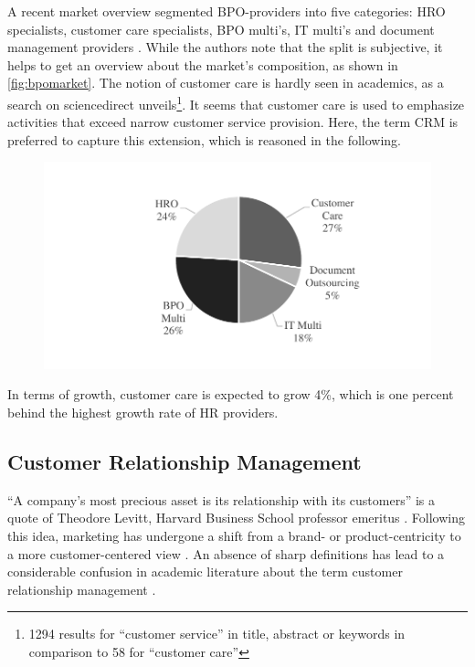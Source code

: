		A recent market overview segmented BPO-providers into five categories: \acrfull{HRO} specialists, customer care specialists, BPO multi's, IT multi's and document management providers \citep{hfs2016top}.  While the authors note that the split is subjective, it helps to get an overview about the market's composition, as shown in \Fig \ref{fig:bpomarket}. The notion of customer care is hardly seen in academics, as a search on sciencedirect unveils\footnote{1294 results for \enquote{customer service} in title, abstract or keywords in comparison to 58 for \enquote{customer care}}. It seems that customer care is used to emphasize activities that exceed narrow customer service provision. Here, the term \acrshort{CRM} is preferred to capture this extension, which is reasoned in the following.	
			
		\begin{figure}[caption={BPO market composition}, label={fig:bpomarket}]
			{	\includegraphics[width=.8\textwidth]{figures/bpomarket.pdf}}
		\end{figure}
	
		In terms of growth, customer care is expected to grow 4\%, which is one percent behind the highest growth rate of HR providers. 
		\subsection{Customer Relationship Management}
		\label{sec:crm}
		\enquote{A company's most precious asset is its relationship with its customers} is a quote of Theodore Levitt, Harvard Business School professor emeritus \citep{levitt1983}. Following this idea, marketing has undergone a shift from a brand- or product-centricity to a more customer-centered view \citep{Chen_2003}. An absence of sharp definitions has lead to a considerable confusion in academic literature about the term customer relationship management \citep{paynefrow2005}. 
		
